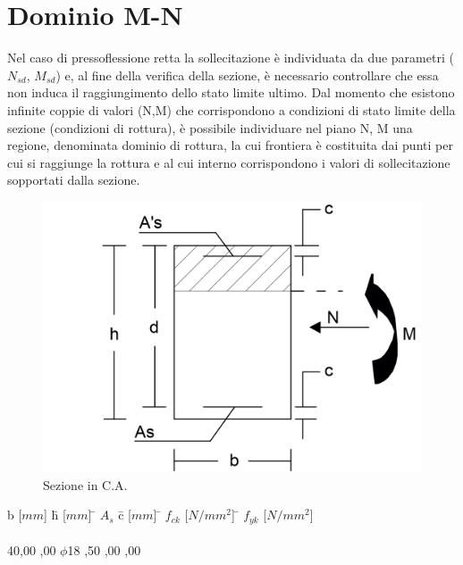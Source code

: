 \documentclass[a4paper,12pt, oneside]{book}
\begin{document}
    \chapter{Dominio M-N}
    
    Nel caso di pressoflessione retta la sollecitazione è individuata da due parametri ($N_{sd}$, $M_{sd}$) e, al fine della verifica della sezione, è necessario controllare che essa non induca il raggiungimento dello stato limite ultimo. Dal momento che esistono infinite coppie di valori (N,M) che corrispondono a condizioni di stato limite della sezione (condizioni di rottura), è possibile individuare nel piano N, M una regione, denominata dominio di rottura, la cui frontiera è costituita dai punti per cui si raggiunge la rottura e al cui interno corrispondono i valori di sollecitazione sopportati dalla sezione.
    
    \begin{figure}[H]
    	\centering
    	\includegraphics[width=0.7\linewidth]{immagini/dominio_sez}
    	\caption{Sezione in C.A.}
    	\label{fig:dominiosez}
    \end{figure}
    
    \begin{tabbing}
    	\hspace*{-1.44cm}b [$mm$] \hspace{3em} \= h [$mm$] \hspace{3em} \= $A_s$ \hspace{3em} \= c [$mm$] \hspace{3em} \= $f_{ck}$ [$N/mm^2$] \hspace{3em} \= $f_{yk}$ [$N/mm^2$] \hspace{1em} \\\\
    	\hspace*{-1.44cm}40,00           ,00          $\phi$18          ,50           ,00                  ,00                                       
    \end{tabbing}
    
\end{document}
